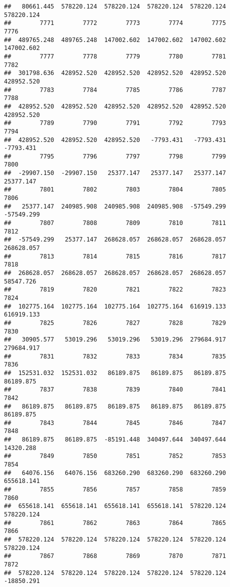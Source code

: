 \documentclass[
]{book}
\begin{document}
\begin{verbatim}
##   80661.445  578220.124  578220.124  578220.124  578220.124  578220.124 
##        7771        7772        7773        7774        7775        7776 
##  489765.248  489765.248  147002.602  147002.602  147002.602  147002.602 
##        7777        7778        7779        7780        7781        7782 
##  301798.636  428952.520  428952.520  428952.520  428952.520  428952.520 
##        7783        7784        7785        7786        7787        7788 
##  428952.520  428952.520  428952.520  428952.520  428952.520  428952.520 
##        7789        7790        7791        7792        7793        7794 
##  428952.520  428952.520  428952.520   -7793.431   -7793.431   -7793.431 
##        7795        7796        7797        7798        7799        7800 
##  -29907.150  -29907.150   25377.147   25377.147   25377.147   25377.147 
##        7801        7802        7803        7804        7805        7806 
##   25377.147  240985.908  240985.908  240985.908  -57549.299  -57549.299 
##        7807        7808        7809        7810        7811        7812 
##  -57549.299   25377.147  268628.057  268628.057  268628.057  268628.057 
##        7813        7814        7815        7816        7817        7818 
##  268628.057  268628.057  268628.057  268628.057  268628.057   58547.726 
##        7819        7820        7821        7822        7823        7824 
##  102775.164  102775.164  102775.164  102775.164  616919.133  616919.133 
##        7825        7826        7827        7828        7829        7830 
##   30905.577   53019.296   53019.296   53019.296  279684.917  279684.917 
##        7831        7832        7833        7834        7835        7836 
##  152531.032  152531.032   86189.875   86189.875   86189.875   86189.875 
##        7837        7838        7839        7840        7841        7842 
##   86189.875   86189.875   86189.875   86189.875   86189.875   86189.875 
##        7843        7844        7845        7846        7847        7848 
##   86189.875   86189.875  -85191.448  340497.644  340497.644   14320.288 
##        7849        7850        7851        7852        7853        7854 
##   64076.156   64076.156  683260.290  683260.290  683260.290  655618.141 
##        7855        7856        7857        7858        7859        7860 
##  655618.141  655618.141  655618.141  655618.141  578220.124  578220.124 
##        7861        7862        7863        7864        7865        7866 
##  578220.124  578220.124  578220.124  578220.124  578220.124  578220.124 
##        7867        7868        7869        7870        7871        7872 
##  578220.124  578220.124  578220.124  578220.124  578220.124  -18850.291 

\end{verbatim}
\end{document}

